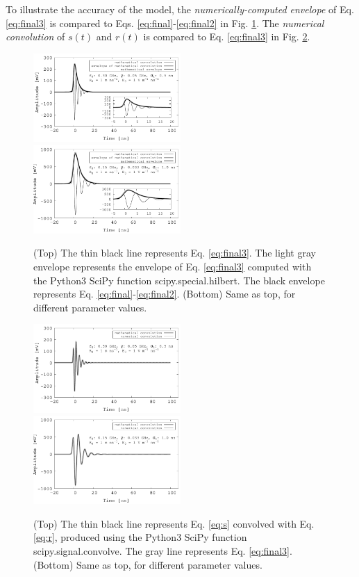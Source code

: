 \documentclass[amsmath,amssymb,aps,prd,10pt,twocolumn,showkeys]{revtex4}
\begin{document}
To illustrate the accuracy of the model, the \textit{numerically-computed envelope} of Eq. \ref{eq:final3} is compared to Eqs. \ref{eq:final}-\ref{eq:final2} in Fig. \ref{fig:fig1}.  The \textit{numerical convolution} of $s(t)$ and $r(t)$ is compared to Eq. \ref{eq:final3} in Fig. \ref{fig:fig2}.
\begin{figure}[ht]
\centering
\includegraphics[width=0.5\textwidth]{July3rd_plot1.pdf}
\includegraphics[width=0.5\textwidth]{July3rd_plot2.pdf}
\caption{\label{fig:fig1} (Top) The thin black line represents Eq. \ref{eq:final3}.  The light gray envelope represents the envelope of Eq. \ref{eq:final3} computed with the Python3 SciPy function scipy.special.hilbert. The black envelope represents Eq. \ref{eq:final}-\ref{eq:final2}. (Bottom) Same as top, for different parameter values.}
\end{figure}
\begin{figure}[ht]
\centering
\includegraphics[width=0.5\textwidth]{July7th_plot1.pdf}
\includegraphics[width=0.5\textwidth]{July7th_plot2.pdf}
\caption{\label{fig:fig2} (Top) The thin black line represents Eq. \ref{eq:s} convolved with Eq. \ref{eq:r}, produced using the Python3 SciPy function scipy.signal.convolve. The gray line represents Eq. \ref{eq:final3}. (Bottom) Same as top, for different parameter values.}
\end{figure}
\end{document}
